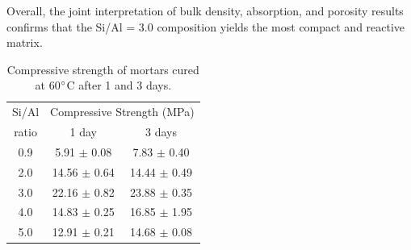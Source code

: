 Overall, the joint interpretation of bulk density, absorption, and porosity results confirms that the Si/Al = 3.0 composition yields the most compact and reactive matrix.

\begin{table}[H]
  \centering
  \caption{Compressive strength of mortars cured at 60$^{\circ}$C after 1 and 3 days.}
  \label{tab:compressive_strength_combined}
  \begin{tabular}{ccc}
  \hline
  {Si/Al} & \multicolumn{2}{c}{Compressive Strength (MPa)} \\
  \cline{2-3}
  ratio & 1 day & 3 days \\
  \hline
  0.9 & 5.91 $\pm$ 0.08 & 7.83 $\pm$ 0.40 \\
  2.0 & 14.56 $\pm$ 0.64 & 14.44 $\pm$ 0.49 \\
  3.0 & 22.16 $\pm$ 0.82 & 23.88 $\pm$ 0.35 \\
  4.0 & 14.83 $\pm$ 0.25 & 16.85 $\pm$ 1.95 \\
  5.0 & 12.91 $\pm$ 0.21 & 14.68 $\pm$ 0.08 \\
  \hline
  \end{tabular}
\end{table}



